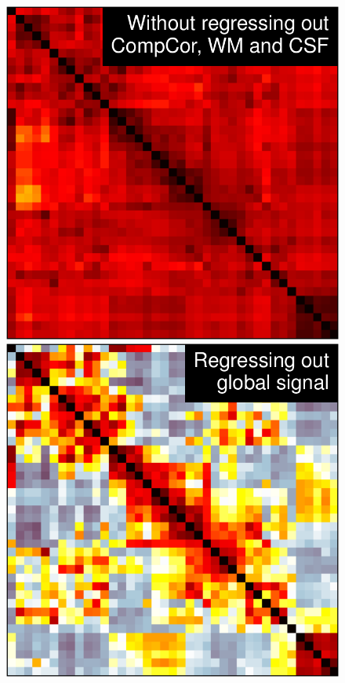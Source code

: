 \documentclass[5p]{elsarticle}
\begin{document}
\begin{figure}
\begin{minipage}{.33\linewidth}
    \includegraphics[width=\linewidth]{group_emp_cov_no_confounds.pdf}%

    \includegraphics[width=\linewidth]{group_emp_cov_global_mean.pdf}%
\end{minipage}%


\end{figure}
\end{document}
